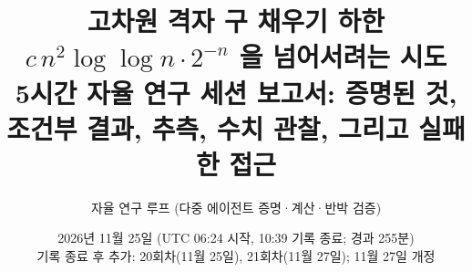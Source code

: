 
\title{\textbf{고차원 격자 구 채우기 하한 $c\,n^2\log\log n\cdot2^{-n}$ 을 넘어서려는 시도}\\[4pt]\large 5시간 자율 연구 세션 보고서: 증명된 것, 조건부 결과, 추측, 수치 관찰, 그리고 실패한 접근}
\author{자율 연구 루프 (다중 에이전트 증명·계산·반박 검증)}
\date{2026년 11월 25일 (UTC 06:24 시작, 10:39 기록 종료; 경과 255분)\\[2pt]{\normalsize 기록 종료 후 추가: 20회차(11월 25일), 21회차(11월 27일); 11월 27일 개정}}

\maketitle
